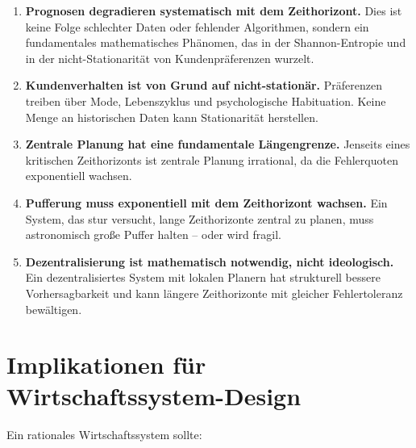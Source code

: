 \documentclass[12pt, a4paper, titlepage]{report}
\theoremstyle{definition}
\theoremstyle{remark}
\begin{document}
\begin{enumerate}
  \item \textbf{Prognosen degradieren systematisch mit dem Zeithorizont.} Dies ist keine Folge schlechter Daten oder fehlender Algorithmen, sondern ein fundamentales mathematisches Phänomen, das in der Shannon-Entropie und in der nicht-Stationarität von Kundenpräferenzen wurzelt.
  
  \item \textbf{Kundenverhalten ist von Grund auf nicht-stationär.} Präferenzen treiben über Mode, Lebenszyklus und psychologische Habituation. Keine Menge an historischen Daten kann Stationarität herstellen.
  
  \item \textbf{Zentrale Planung hat eine fundamentale Längengrenze.} Jenseits eines kritischen Zeithorizonts ist zentrale Planung irrational, da die Fehlerquoten exponentiell wachsen.
  
  \item \textbf{Pufferung muss exponentiell mit dem Zeithorizont wachsen.} Ein System, das stur versucht, lange Zeithorizonte zentral zu planen, muss astronomisch große Puffer halten – oder wird fragil.
  
  \item \textbf{Dezentralisierung ist mathematisch notwendig, nicht ideologisch.} Ein dezentralisiertes System mit lokalen Planern hat strukturell bessere Vorhersagbarkeit und kann längere Zeithorizonte mit gleicher Fehlertoleranz bewältigen.
\end{enumerate}

\section{Implikationen für Wirtschaftssystem-Design}

Ein rationales Wirtschaftssystem sollte:
\end{document}
